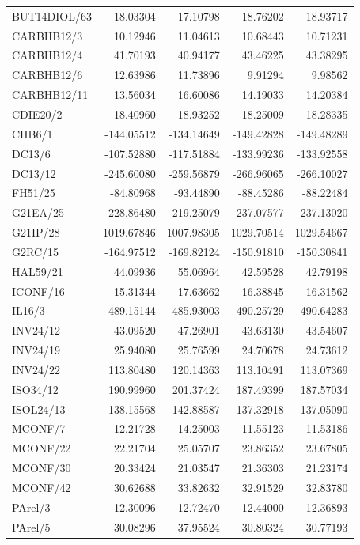 \documentclass[10pt,a4paper]{article}
\begin{document}
{\begin{longtable}{@{}lrrrr@{}}
BUT14DIOL/63 & 18.03304 & 17.10798 & 18.76202 & 18.93717 \\
CARBHB12/3 & 10.12946 & 11.04613 & 10.68443 & 10.71231 \\
CARBHB12/4 & 41.70193 & 40.94177 & 43.46225 & 43.38295 \\
CARBHB12/6 & 12.63986 & 11.73896 & 9.91294 & 9.98562 \\
CARBHB12/11 & 13.56034 & 16.60086 & 14.19033 & 14.20384 \\
CDIE20/2 & 18.40960 & 18.93252 & 18.25009 & 18.28335 \\
CHB6/1 & -144.05512 & -134.14649 & -149.42828 & -149.48289 \\
DC13/6 & -107.52880 & -117.51884 & -133.99236 & -133.92558 \\
DC13/12 & -245.60080 & -259.56879 & -266.96065 & -266.10027 \\
FH51/25 & -84.80968 & -93.44890 & -88.45286 & -88.22484 \\
G21EA/25 & 228.86480 & 219.25079 & 237.07577 & 237.13020 \\
G21IP/28 & 1019.67846 & 1007.98305 & 1029.70514 & 1029.54667 \\
G2RC/15 & -164.97512 & -169.82124 & -150.91810 & -150.30841 \\
HAL59/21 & 44.09936 & 55.06964 & 42.59528 & 42.79198 \\
ICONF/16 & 15.31344 & 17.63662 & 16.38845 & 16.31562 \\
IL16/3 & -489.15144 & -485.93003 & -490.25729 & -490.64283 \\
INV24/12 & 43.09520 & 47.26901 & 43.63130 & 43.54607 \\
INV24/19 & 25.94080 & 25.76599 & 24.70678 & 24.73612 \\
INV24/22 & 113.80480 & 120.14363 & 113.10491 & 113.07369 \\
ISO34/12 & 190.99960 & 201.37424 & 187.49399 & 187.57034 \\
ISOL24/13 & 138.15568 & 142.88587 & 137.32918 & 137.05090 \\
MCONF/7 & 12.21728 & 14.25003 & 11.55123 & 11.53186 \\
MCONF/22 & 22.21704 & 25.05707 & 23.86352 & 23.67805 \\
MCONF/30 & 20.33424 & 21.03547 & 21.36303 & 21.23174 \\
MCONF/42 & 30.62688 & 33.82632 & 32.91529 & 32.83780 \\
PArel/3 & 12.30096 & 12.72470 & 12.44000 & 12.36893 \\
PArel/5 & 30.08296 & 37.95524 & 30.80324 & 30.77193 \\

\end{longtable}}
\end{document}
